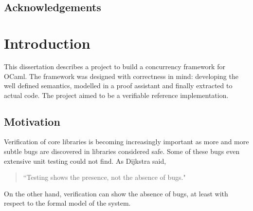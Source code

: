 \documentclass[12pt,twoside,notitlepage]{report}
\theoremstyle{plain}%
\theoremstyle{definition}
\theoremstyle{remark}
\begin{document}
\bigskip\bigskip


\leftline{\rule{12em}{1pt}}



\medskip
{}

\cleardoublepage


\tableofcontents

\listoffigures

\lstlistoflistings

\listoftheorems[numwidth=3em]



\newpage
\section*{Acknowledgements}


\cleardoublepage        %

\setcounter{page}{1}
\pagestyle{headings}
\chapter{Introduction}

This dissertation describes a project to build a concurrency framework for OCaml. The framework was designed with correctness in mind: developing the well defined semantics, modelled in a proof assistant and finally extracted to actual code. The project aimed to be a verifiable reference implementation. 

\section{Motivation}
Verification of core libraries is becoming increasingly important as more and more subtle bugs are discovered in libraries considered safe. Some of these bugs even extensive unit testing could not find. As Dijkstra said, \begin{quote}``Testing shows the presence, not the absence of bugs."\end{quote} On the other hand, verification can show the absence of bugs, at least with respect to the formal model of the system.
\end{document}
